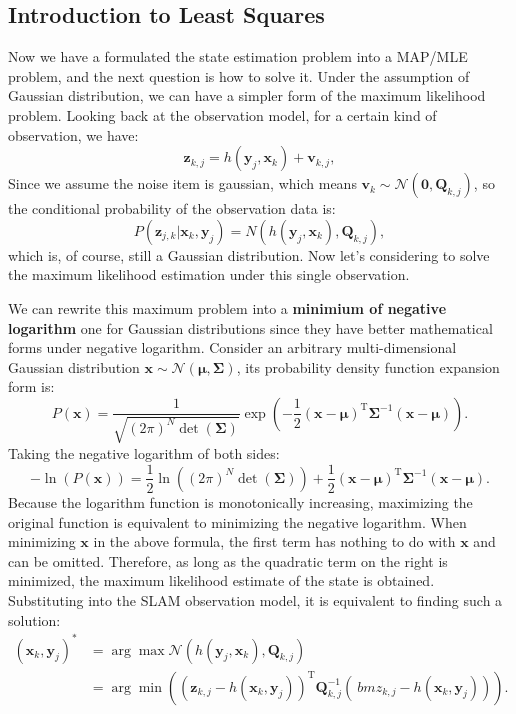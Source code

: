 \subsection{Introduction to Least Squares}
Now we have a formulated the state estimation problem into a MAP/MLE problem, and the next question is how to solve it. Under the assumption of Gaussian distribution, we can have a simpler form of the maximum likelihood problem. Looking back at the observation model, for a certain kind of observation, we have:
\[
{\bm{z}_{k,j}} = h\left( {{ \bm{y}_j},{ \bm{x}_k}} \right)+ \bm{v}_{k, j},
\]
Since we assume the noise item is gaussian, which means ${\bm{v}_k} \sim \mathcal{N}\left( {\bm{0},{{{\bm{Q}}}_{k,j}}} \right)$, so the conditional probability of the observation data is:
\[
P( \bm{z}_{j,k} | \bm{x}_k, \bm{y}_j) = N\left( h(\bm{y}_j, \bm{x}_k), \bm{Q}_{k,j} \right),
\]
which is, of course, still a Gaussian distribution. Now let's considering to solve the maximum likelihood estimation under this single observation. 

We can rewrite this maximum problem into a \textbf{minimium of negative logarithm} one for Gaussian distributions since they have better mathematical forms under negative logarithm. Consider an arbitrary multi-dimensional Gaussian distribution $\bm{x} \sim \mathcal{N}(\bm{\mu}, \bm{\Sigma})$, its probability density function expansion form is:
\begin{equation}
	P\left( \bm{x} \right) = \frac{1}{{\sqrt {{{(2\pi )}^N}\det (\bm{\Sigma} )} }}\exp \left( {-\frac{1}{2}{{\left( {\bm{x}-\bm{\mu}} \right)}^\mathrm{T}}{ \bm{\Sigma} ^ {-1}}\left( {\bm{x}-\bm{\mu}} \right)} \right).
\end{equation}
Taking the negative logarithm of both sides:
\begin{equation}
	-\ln \left( {P\left( \bm{x} \right)} \right) = \frac{1}{2}\ln \left( {{{\left( {2\pi} \right )}^N}\det \left( \bm{\Sigma} \right)} \right) + \frac{1}{2}{\left( {\bm{x}-\bm{\mu}} \right)^\mathrm{T}}{\bm{\Sigma} ^{-1}}\left( {\bm{x}-\bm{\mu}} \right).
\end{equation}
Because the logarithm function is monotonically increasing, maximizing the original function is equivalent to minimizing the negative logarithm. When minimizing $\bm{x}$ in the above formula, the first term has nothing to do with $\bm{x}$ and can be omitted. Therefore, as long as the quadratic term on the right is minimized, the maximum likelihood estimate of the state is obtained. Substituting into the SLAM observation model, it is equivalent to finding such a solution:
\begin{equation}
	\begin{aligned}
		(\bm{x}_k,\bm{y}_j)^* &= \arg \max \mathcal{N}(h(\bm{y}_j, \bm{x}_k), \bm{Q }_{k,j}) \\ &= \arg \min \left( {{{\left( {{ \bm{z}_{k,j}}-h\left( {{\bm{x }_k},{\bm{y}_j}} \right)} \right)}^\mathrm{T}} \bm{Q}_{k,j}^{-1}\left( {{\ bm{z}_{k,j}}-h\left( {{\bm{x}_k},{\bm{y}_j}} \right)} \right)} \right).
	\end{aligned}
\end{equation}

